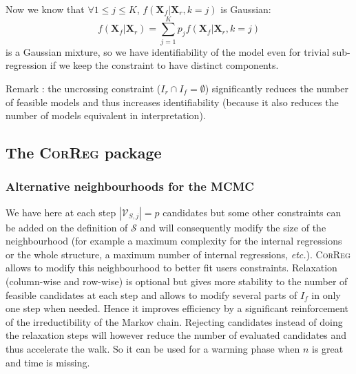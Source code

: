 \documentclass[11pt,a4paper]{article}
\begin{document}
				
				Now we know that $\forall 1\leq j \leq K$,  $f(\boldsymbol{X}_f|\boldsymbol{X}_r,k=j)$ is Gaussian:
				\begin{equation}
				f(\boldsymbol{X}_f|\boldsymbol{X}_r)=\sum_{j=1}^Kp_jf(\boldsymbol{X}_f|\boldsymbol{X}_r,k=j)
				\end{equation}
				is a Gaussian mixture, so we have identifiability of the model even for trivial sub-regression if we keep the constraint to have distinct components.


%	
	Remark : the uncrossing constraint ($I_r\cap I_f = \emptyset$) significantly reduces the number of feasible models and thus increases identifiability (because it also reduces the number of models equivalent in interpretation).
	
%	

	
	\subsection{The \textsc{CorReg} package}
\subsubsection{Alternative neighbourhoods for the MCMC}
	We have here at each step $|\mathcal{V}_{S,j}|=p$ candidates but some other constraints can be added on the definition of $\mathcal{S}$ and will consequently modify the size of the neighbourhood (for example a maximum complexity for the internal regressions or the whole structure, a maximum number of internal regressions, {\it etc.}). \textsc{CorReg} allows to modify this neighbourhood to better fit users constraints. Relaxation (column-wise and row-wise) is optional but gives more stability to the number of feasible candidates at each step and allows to modify several parts of $I_f$ in only one step when needed. Hence it improves efficiency by a significant reinforcement of the irreductibility of the Markov chain. Rejecting candidates instead of doing the relaxation steps will  however reduce the number of evaluated candidates and thus accelerate the walk. So it can be used for a warming phase when $n$ is great and time is missing.
	
\end{document}
